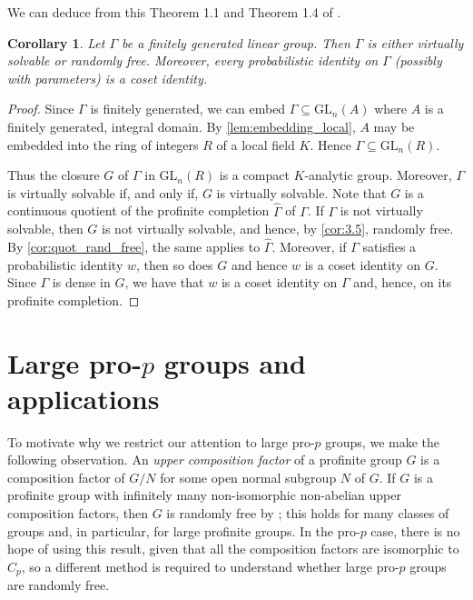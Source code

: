 \documentclass[a4paper,10pt]{amsart}
\theoremstyle{plain}
\newtheorem{corollary}[thm]{Corollary}
\theoremstyle{definition}
\numberwithin{equation}{section}
\begin{document}
We can deduce from this Theorem 1.1 and Theorem 1.4 of \cite{LS16}.
\begin{corollary}\label{cor:general_LS_1.4}
    Let $\Gamma$ be a finitely generated linear group. Then $\Gamma$ is either virtually solvable or randomly free. Moreover, every probabilistic identity on $\Gamma$ (possibly with parameters) is a coset identity.
\end{corollary}
\begin{proof}
    Since $\Gamma$ is finitely generated, we can embed
$\Gamma \subseteq \mathrm{GL}_n(A)$ where $A$ is a finitely generated, integral domain. By \cref{lem:embedding_local}, $A$ may be embedded into the ring of integers $R$ of a local field $K$. Hence $\Gamma \subseteq \mathrm{GL}_n(R)$.

Thus the closure $G$ of $\Gamma$ in $\mathrm{GL}_n(R)$ is a compact $K$-analytic group. Moreover, $\Gamma$ is virtually solvable if, and only if, $G$ is virtually solvable. 
Note that $G$ is a continuous quotient of the profinite completion $\widehat{\Gamma}$ of $\Gamma$. If $\Gamma$ is not virtually solvable, then $G$ is not virtually solvable, and hence,  by \cref{cor:3.5}, randomly free.  By \cref{cor:quot_rand_free},
the same applies to $\widehat{\Gamma}$. Moreover, if $\Gamma$ satisfies a probabilistic identity $w$, then so does $G$ and hence $w$ is a coset identity on $G$. Since $\Gamma$ is dense in $G$, we have that $w$ is a coset identity on $\Gamma$ and, hence, on its profinite completion.
\end{proof}
	
\section{Large pro-\texorpdfstring{$p$}{p} groups and applications}\label{sec:free_constr} 


To motivate why we restrict our attention to large pro-$p$ groups, we make the following observation. An \emph{upper composition factor} of a profinite group $G$ is a composition factor of $G/N$ for some open normal subgroup $N$ of $G$. If $G$ is a profinite group with infinitely many non-isomorphic non-abelian upper composition factors, then $G$ is randomly free by \cite[Theorem 1.5]{LS18}; this holds for many classes of groups and, in particular, for large profinite groups. In the pro-$p$ case, there is no hope of using this result, given that all the composition factors are isomorphic to $C_p$, so a different method is required to understand whether large pro-$p$ groups are randomly free. 
\end{document}

